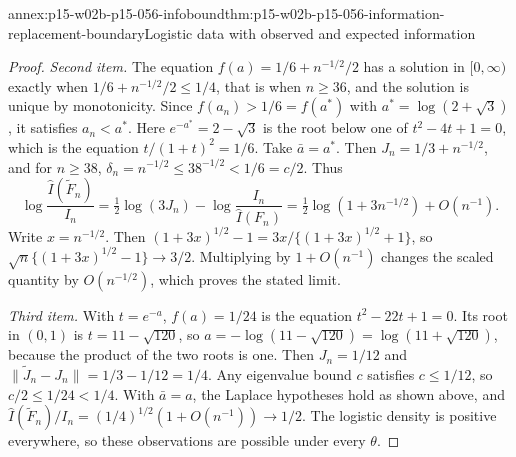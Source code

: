 \begin{annexitem}{annex:p15-w02b-p15-056-infobound}{thm:p15-w02b-p15-056-information-replacement-boundary}{Logistic data with observed and expected information}
\begin{proof}
\emph{Second item.} The equation \(f(a)=1/6+n^{-1/2}/2\) has a solution
in \([0,\infty)\) exactly when \(1/6+n^{-1/2}/2\leq1/4\), that is when
\(n\geq36\), and the solution is unique by monotonicity. Since
\(f(a_n)>1/6=f(a^*)\) with \(a^*=\log(2+\sqrt3)\), it satisfies
\(a_n<a^*\). Here \(e^{-a^*}=2-\sqrt3\) is the root below one of
\(t^2-4t+1=0\), which is the equation \(t/(1+t)^2=1/6\). Take
\(\bar a=a^*\). Then \(J_n=1/3+n^{-1/2}\), and for \(n\geq38\),
\(\delta_n=n^{-1/2}\leq38^{-1/2}<1/6=c/2\). Thus
\[
 \log\frac{\widehat I(\widetilde F_n)}{I_n}
 =\tfrac12\log(3J_n)-\log\frac{I_n}{\widehat I(F_n)}
 =\tfrac12\log(1+3n^{-1/2})+O(n^{-1}).
\]
Write \(x=n^{-1/2}\). Then
\((1+3x)^{1/2}-1=3x/\{(1+3x)^{1/2}+1\}\), so
\(\sqrt n\{(1+3x)^{1/2}-1\}\to3/2\). Multiplying by \(1+O(n^{-1})\)
changes the scaled quantity by \(O(n^{-1/2})\), which proves the stated
limit.

\emph{Third item.} With \(t=e^{-a}\), \(f(a)=1/24\) is the equation
\(t^2-22t+1=0\). Its root in \((0,1)\) is \(t=11-\sqrt{120}\), so
\(a=-\log(11-\sqrt{120})=\log(11+\sqrt{120})\), because the product of
the two roots is one. Then \(J_n=1/12\) and
\(\|\widetilde J_n-J_n\|=1/3-1/12=1/4\). Any eigenvalue bound \(c\)
satisfies \(c\leq1/12\), so \(c/2\leq1/24<1/4\). With \(\bar a=a\), the
Laplace hypotheses hold as shown above, and
\(\widehat I(\widetilde F_n)/I_n=(1/4)^{1/2}(1+O(n^{-1}))\to1/2\).
The logistic density is positive everywhere, so these observations are
possible under every \(\theta\).
\end{proof}
\end{annexitem}


